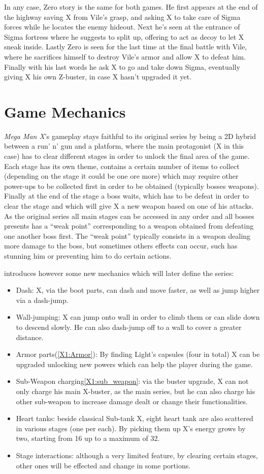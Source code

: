 In any case, Zero story is the same for both games. He first appears at the end of the highway saving X from Vile's grasp, and asking X to take care of Sigma forces while he locates the enemy hideout. Next he's seen at the entrance of Sigma fortress where he suggests to split up, offering to act as decoy to let X sneak inside. Lastly Zero is seen for the last time at the final battle with Vile, where he sacrifices himself to destroy Vile's armor and allow X to defeat him. Finally with his last words he ask X to go and take down Sigma, eventually giving X his own Z-buster, in case X hasn't upgraded it yet.
\section{Game Mechanics}
\textit{Mega Man X}'s gameplay stays faithful to its original series by being a 2D hybrid between a run' n' gun and a platform, where the main protagonist (X in this case) has to clear different stages in order to unlock the final area of the game. Each stage has its own theme, contains a certain number of items to collect (depending on the stage it could be one ore more) which may require other power-ups to be collected first in order to be obtained (typically bosses weapons). Finally at the end of the stage a boss waits, which has to be defeat in order to clear the stage and which will give X a new weapon based on one of his attacks. As the original series all main stages can be accessed in any order and all bosses presents has a ``weak point'' corresponding to a weapon obtained from defeating one another boss first. The ``weak point'' typically consists in a weapon dealing more damage to the boss, but sometimes others effects can occur, such has stunning him or preventing him to do certain actions.

\x introduces however some new mechanics which will later define the series\cite{wiki:X1_features}:
\begin{itemize}
	\item Dash: X, via the boot parts, can dash and move faster, as well as jump higher via a dash-jump.
	\item Wall-jumping: X can jump onto wall in order to climb them or can slide down to descend slowly. He can also dash-jump off to a wall to cover a greater distance.
	\item Armor parts(\ref{X1:Armor}): By finding Light's capsules (four in total) X can be upgraded unlocking new powers which can help the player during the game.
	\item Sub-Weapon charging\ref{X1:sub_weapon}: via the buster upgrade, X can not only charge his main X-buster, as the main series, but he can also charge his other sub-weapon to increase damage dealt or change their functionalities.
	\item Heart tanks: beside classical Sub-tank X, eight heart tank are also scattered in various stages (one per each). By picking them up X's energy grows by two, starting from 16 up to a maximum of 32\cite{stratwiki:Heart_tank}.
	\item Stage interactions: although a very limited feature, by clearing certain stages, other ones will be effected and change in some portions.
\end{itemize}
